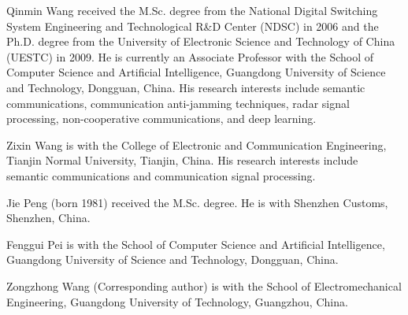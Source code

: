 \documentclass{ieeetj}
\theoremstyle{plain}
\theoremstyle{definition}
\begin{document}
\begin{IEEEbiographynophoto}
{Qinmin Wang} received the M.Sc. degree from the National Digital Switching
System Engineering and Technological R\&D Center (NDSC) in 2006 and the Ph.D.
degree from the University of Electronic Science and Technology of China
(UESTC) in 2009. He is currently an Associate Professor with the School of
Computer Science and Artificial Intelligence, Guangdong University of Science
and Technology, Dongguan, China. His research interests include semantic
communications, communication anti-jamming techniques, radar signal
processing, non-cooperative communications, and deep learning.
\end{IEEEbiographynophoto}

\begin{IEEEbiographynophoto}
{Zixin Wang} is with the College of Electronic and Communication Engineering,
Tianjin Normal University, Tianjin, China. His research interests include
semantic communications and communication signal processing.
\end{IEEEbiographynophoto}

\begin{IEEEbiographynophoto}
{Jie Peng} (born 1981) received the M.Sc. degree. He is with Shenzhen Customs, Shenzhen,
China.
\end{IEEEbiographynophoto}

\begin{IEEEbiographynophoto}
{Fenggui Pei} is with the School of Computer Science and Artificial
Intelligence, Guangdong University of Science and Technology, Dongguan, China.
\end{IEEEbiographynophoto}

\begin{IEEEbiographynophoto}
{Zongzhong Wang} (Corresponding author) is with the School of
Electromechanical Engineering, Guangdong University of Technology, Guangzhou,
China.
\end{IEEEbiographynophoto}
\end{document}

